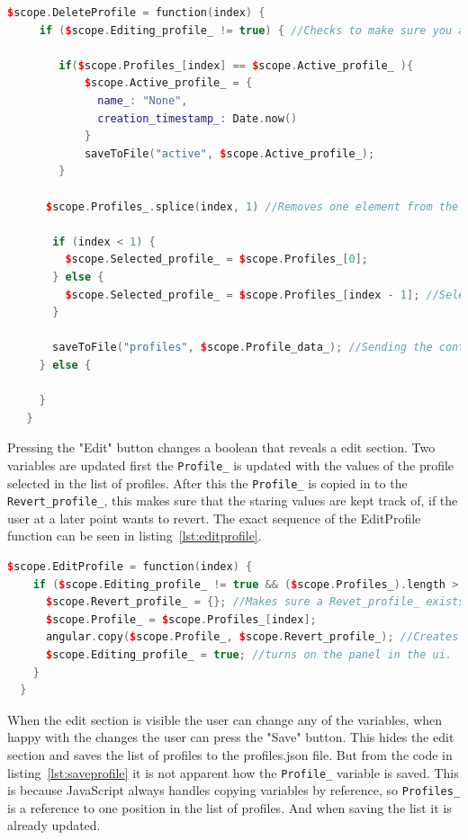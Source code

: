 \begin{lstlisting}[caption = {DeleteProfile function in editParam.js}, captionpos=b, label={lst:deleteprofile}, language=C++,firstnumber=1]
 $scope.DeleteProfile = function(index) {
     if ($scope.Editing_profile_ != true) { //Checks to make sure you are not deleting the profile that's currently being edited
 
 		if($scope.Profiles_[index] == $scope.Active_profile_ ){
 			$scope.Active_profile_ = {
 		      name_: "None",
 		      creation_timestamp_: Date.now()
 		    }
 			saveToFile("active", $scope.Active_profile_);
 		}
 
 	  $scope.Profiles_.splice(index, 1) //Removes one element from the list at index
 
       if (index < 1) {
         $scope.Selected_profile_ = $scope.Profiles_[0];
       } else {
         $scope.Selected_profile_ = $scope.Profiles_[index - 1]; //Selects the profile under the one deleted.
       }
 
       saveToFile("profiles", $scope.Profile_data_); //Sending the content to the server to get saved.
     } else {
 
     }
   }
\end{lstlisting}

Pressing the "Edit" button changes a boolean that reveals a edit section. Two variables are updated first the \texttt{Profile\_} is updated with the values of the profile selected in the list of profiles. After this the \texttt{Profile_} is copied in to the \texttt{Revert\_profile\_}, this makes sure that the staring values are kept track of, if the user at a later point wants to revert. The exact sequence of the EditProfile function can be seen in listing~\ref{lst:editprofile}.

\begin{lstlisting}[caption = {EditProfile function in editParam.js}, captionpos=b, label={lst:editprofile}, language=C++,firstnumber=1]
$scope.EditProfile = function(index) {
    if ($scope.Editing_profile_ != true && ($scope.Profiles_).length > 0) { //Makes sure that there is something to edit!
      $scope.Revert_profile_ = {}; //Makes sure a Revet_profile_ exists
      $scope.Profile_ = $scope.Profiles_[index];
      angular.copy($scope.Profile_, $scope.Revert_profile_); //Creates a copy of Profile_ into Revert_profile_ instead of reference
      $scope.Editing_profile_ = true; //turns on the panel in the ui.
    }
  }
\end{lstlisting}

When the edit section is visible the user can change any of the variables, when happy with the changes the user can press the "Save" button. This hides the edit section and saves the list of profiles to the profiles.json file. But from the code in listing~\ref{lst:saveprofile} it is not apparent how the \texttt{Profile\_} variable is saved. This is because JavaScript always handles copying variables by reference, so \texttt{Profiles\_} is a reference to one position in the list of profiles. And when saving the list it is already updated.


